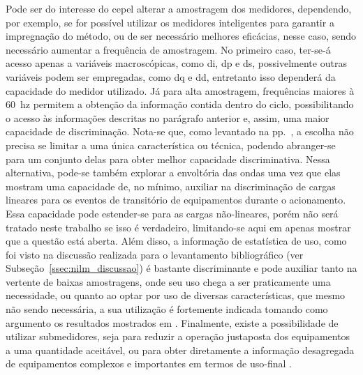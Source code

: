 Pode ser do interesse do \acs{cepel} alterar a amostragem dos
medidores, dependendo, por exemplo, se for possível utilizar os
medidores inteligentes para garantir a impregnação do método, ou de
ser necessário melhores eficácias, nesse caso, sendo necessário
aumentar a frequência de amostragem. No primeiro caso,
ter-se-á acesso apenas a variáveis macroscópicas, como \acs{di}, \acs{dp}
e \acs{ds}, possivelmente outras variáveis podem ser empregadas, como
\acs{dq} e \acs{dd}, entretanto isso dependerá da capacidade do
medidor utilizado. Já para alta amostragem, 
frequências maiores à 60~\acs{hz} permitem a obtenção da informação
contida dentro do ciclo, possibilitando o acesso às informações
descritas no parágrafo anterior e, assim, uma maior capacidade de
discriminação. Nota-se que, como levantado na
pp.~\pageref{nilm:multiplas_tecnicas}, a escolha não precisa se limitar
a uma única característica ou técnica, podendo abranger-se para um
conjunto delas para obter melhor capacidade discriminativa. Nessa
alternativa, pode-se também explorar a envoltória das ondas uma vez que
elas mostram uma capacidade de, no mínimo, auxiliar na discriminação
de cargas lineares para os eventos de transitório de equipamentos durante
o acionamento. Essa capacidade pode estender-se para as
cargas não-lineares, porém não será tratado neste trabalho se isso
é verdadeiro, limitando-se aqui em apenas mostrar que a questão
está aberta. Além disso, a informação de estatística de uso, como foi
visto na discussão realizada para o levantamento bibliográfico (ver
Subseção~\ref{ssec:nilm_discussao}) é bastante discriminante e pode
auxiliar tanto na vertente de baixas amostragens, onde seu uso chega a
ser praticamente uma necessidade, ou quanto ao optar por uso de
diversas características, que mesmo não sendo necessária, a sua
utilização é fortemente indicada tomando como argumento os resultados
mostrados em
\cite{nilm_zeifman_vast_2011,nilm_zeifman_vastext_approach_2012,
nilm_zeifman_statistical_vastext_1stws_2012,
nilm_zeifman_vast_hisample_pdfmerge_2011,
nilm_zeifman_statistical_naive_enduses_2013}. Finalmente, existe a
possibilidade de utilizar submedidores, seja para reduzir a operação
justaposta dos equipamentos a uma quantidade aceitável, ou para obter
diretamente a informação desagregada de equipamentos complexos e
importantes em termos de uso-final
\cite{seminilm_ihome_tomek_2012,seminilm_fhmm_empiricalnmeter_2013,
seminilm_berges_multisensor_2010}.



